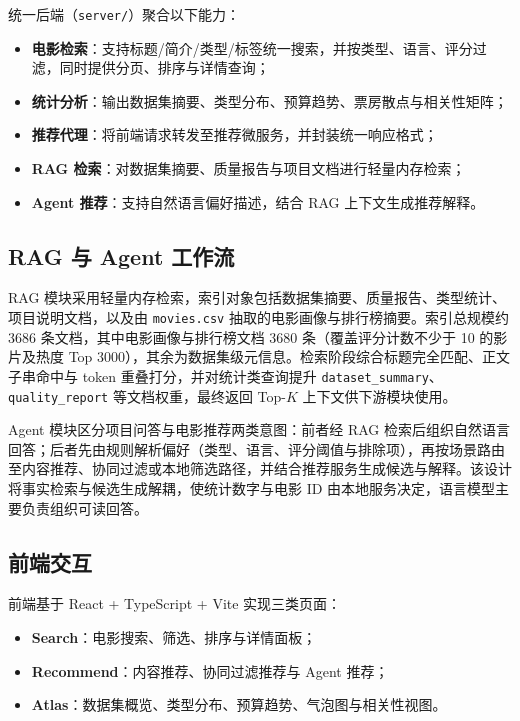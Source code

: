 统一后端（\texttt{server/}）聚合以下能力：

\begin{itemize}
    \item \textbf{电影检索}：支持标题/简介/类型/标签统一搜索，并按类型、语言、评分过滤，同时提供分页、排序与详情查询；
    \item \textbf{统计分析}：输出数据集摘要、类型分布、预算趋势、票房散点与相关性矩阵；
    \item \textbf{推荐代理}：将前端请求转发至推荐微服务，并封装统一响应格式；
    \item \textbf{RAG 检索}：对数据集摘要、质量报告与项目文档进行轻量内存检索；
    \item \textbf{Agent 推荐}：支持自然语言偏好描述，结合 RAG 上下文生成推荐解释。
\end{itemize}

\subsection{RAG 与 Agent 工作流}

RAG 模块采用轻量内存检索，索引对象包括数据集摘要、质量报告、类型统计、项目说明文档，以及由 \texttt{movies.csv} 抽取的电影画像与排行榜摘要。索引总规模约 3686 条文档，其中电影画像与排行榜文档 3680 条（覆盖评分计数不少于 10 的影片及热度 Top 3000），其余为数据集级元信息。检索阶段综合标题完全匹配、正文子串命中与 token 重叠打分，并对统计类查询提升 \texttt{dataset\_summary}、\texttt{quality\_report} 等文档权重，最终返回 Top-$K$ 上下文供下游模块使用。

Agent 模块区分项目问答与电影推荐两类意图：前者经 RAG 检索后组织自然语言回答；后者先由规则解析偏好（类型、语言、评分阈值与排除项），再按场景路由至内容推荐、协同过滤或本地筛选路径，并结合推荐服务生成候选与解释。该设计将事实检索与候选生成解耦，使统计数字与电影 ID 由本地服务决定，语言模型主要负责组织可读回答。

\subsection{前端交互}

前端基于 React + TypeScript + Vite 实现三类页面：

\begin{itemize}
    \item \textbf{Search}：电影搜索、筛选、排序与详情面板；
    \item \textbf{Recommend}：内容推荐、协同过滤推荐与 Agent 推荐；
    \item \textbf{Atlas}：数据集概览、类型分布、预算趋势、气泡图与相关性视图。
\end{itemize}

